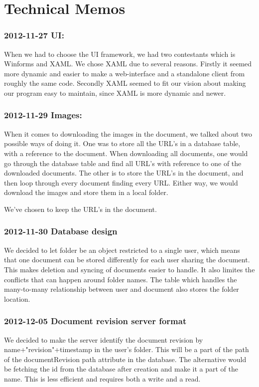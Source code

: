\documentclass[a4paper,11pt,report]{report}
\begin{document}
\section{Technical Memos}
\subsubsection{2012-11-27 UI:}
When we had to choose the UI framework, we had two contestants which is Winforms and XAML. We chose XAML due to several reasons. Firstly it seemed more dynamic and easier to make a web-interface and a standalone client from roughly the same code. Secondly XAML seemed to fit our vision about making our program easy to maintain, since XAML is more dynamic and newer.

\subsubsection{2012-11-29 Images:}
When it comes to downloading the images in the document, we talked about two possible ways of doing it.
One was to store all the URL's in a database table, with a reference to the document. When downloading all documents, one would go through the database table and find all URL's with reference to one of the downloaded documents.
The other is to store the URL's in the document, and then loop through every document finding every URL.
Either way, we would download the images and store them in a local folder.

 We've chosen to keep the URL's in the document.

\subsubsection{2012-11-30 Database design}
We decided to let folder be an object restricted to a single user, which means that one document can be stored differently for each user sharing the document.
This makes deletion and syncing of documents easier to handle. It also limites the conflicts that can happen around folder names.
The table which handles the many-to-many relationship between user and document also stores the folder location.

\subsubsection{2012-12-05 Document revision server format}
We decided to make the server identify the document revision by name+"revision"+timestamp in the user's folder.
This will be a part of the path of the documentRevision path attribute in the database. The alternative would be fetching the id from the database
after creation and make it a part of the name. This is less efficient and requires both a write and a read.
\end{document}
